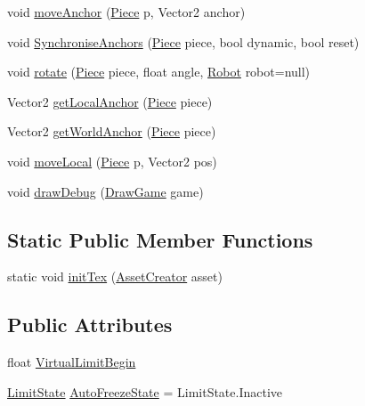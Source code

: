 \begin{DoxyCompactItemize}
\item 
void \hyperlink{classgearit_1_1src_1_1robot_1_1_revolute_spot_af6605ea66d768d15928a40436a6e4465}{move\+Anchor} (\hyperlink{classgearit_1_1src_1_1robot_1_1_piece}{Piece} p, Vector2 anchor)
\item 
void \hyperlink{classgearit_1_1src_1_1robot_1_1_revolute_spot_aaaa8f29d01045c4c832f984004912add}{Synchronise\+Anchors} (\hyperlink{classgearit_1_1src_1_1robot_1_1_piece}{Piece} piece, bool dynamic, bool reset)
\item 
void \hyperlink{classgearit_1_1src_1_1robot_1_1_revolute_spot_ab1a206e687b3400b63de82b9c1da622d}{rotate} (\hyperlink{classgearit_1_1src_1_1robot_1_1_piece}{Piece} piece, float angle, \hyperlink{classgearit_1_1src_1_1robot_1_1_robot}{Robot} robot=null)
\item 
Vector2 \hyperlink{classgearit_1_1src_1_1robot_1_1_revolute_spot_a60e1f691bf05a9819a0b1d32b2d22658}{get\+Local\+Anchor} (\hyperlink{classgearit_1_1src_1_1robot_1_1_piece}{Piece} piece)
\item 
Vector2 \hyperlink{classgearit_1_1src_1_1robot_1_1_revolute_spot_afba860acdd930c42d5d46e60bfd67f6a}{get\+World\+Anchor} (\hyperlink{classgearit_1_1src_1_1robot_1_1_piece}{Piece} piece)
\item 
void \hyperlink{classgearit_1_1src_1_1robot_1_1_revolute_spot_a341ad56b373e7a4150564a9195cf8f86}{move\+Local} (\hyperlink{classgearit_1_1src_1_1robot_1_1_piece}{Piece} p, Vector2 pos)
\item 
void \hyperlink{classgearit_1_1src_1_1robot_1_1_revolute_spot_a519b0d5fdaf431f2f5f5bc71ef73429f}{draw\+Debug} (\hyperlink{classgearit_1_1src_1_1_draw_game}{Draw\+Game} game)
\end{DoxyCompactItemize}
\subsection*{Static Public Member Functions}
\begin{DoxyCompactItemize}
\item 
static void \hyperlink{classgearit_1_1src_1_1robot_1_1_revolute_spot_a625d49c6cffc16603c6ae22b16d3830d}{init\+Tex} (\hyperlink{classgearit_1_1src_1_1utility_1_1_asset_creator}{Asset\+Creator} asset)
\end{DoxyCompactItemize}
\subsection*{Public Attributes}
\begin{DoxyCompactItemize}
\item 
float \hyperlink{classgearit_1_1src_1_1robot_1_1_revolute_spot_a04645244f06d643f059fd8dd31cccdce}{Virtual\+Limit\+Begin}
\item 
\hyperlink{namespace_farseer_physics_1_1_dynamics_1_1_joints_a31a093d39ac5f01671837f083d915a35}{Limit\+State} \hyperlink{classgearit_1_1src_1_1robot_1_1_revolute_spot_aad3f7f2c138250daaa4479bf3dd0e74b}{Auto\+Freeze\+State} = Limit\+State.\+Inactive
\end{DoxyCompactItemize}
